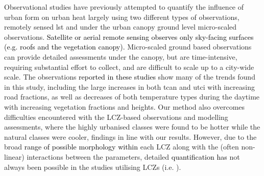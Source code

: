 \documentclass[final,3p,times,authoryear]{elsarticle}
\newcommand{\add}[1]{\textcolor{black}{#1}}
\newcommand{\remove}[1]{\textcolor{red}{\st{}}}
\begin{document}
Observational studies have previously attempted to quantify the influence of urban form on urban heat largely using two different types of observations,\remove{top of the urban canopy} remotely sensed \gls{lst} and under the urban canopy ground level micro-scaled observations. \add{Satellite or aerial remote sensing observes only sky-facing surfaces (e.g. roofs and the vegetation canopy).} Micro-scaled ground based observations can provide detailed assessments under the canopy, but are time-intensive, requiring substantial effort to collect, and are difficult to scale up to a city-wide scale. \remove{The observations from other studies demonstrate the usefulness of the results and the application of the systematic modelling in this study.}The observations \add{reported in these studies} show many of the trends found in this study, including the large increases in both \gls{tcan} and \gls{utci} with increasing road fractions, as well as decreases of both temperature types during the daytime with increasing vegetation fractions and heights. Our method also overcomes difficulties encountered with the LCZ-based observations and modelling assessments, where the highly urbanised classes were found to be hotter while the natural classes were cooler, findings in line with our results. However, due to the broad \remove{ranges}\add{range of possible morphology within} each LCZ \remove{can represent}along with the (often non-linear) interactions between the parameters, detailed \remove{and specific quantifications have}\add{quantification has} not always been possible in the studies utilising LCZs (i.e. \cite{Emery2021}).\remove{Our method allows the influence of elements of urban form to be quantified as heights and fractional amounts of land cover are incrementally increased and decreased.}
\end{document}
